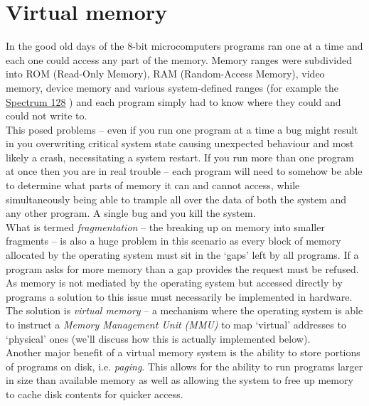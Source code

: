 \section{Virtual memory}

In the good old days of the 8-bit microcomputers programs ran one at a time and
each one could access any part of the memory. Memory ranges were subdivided into
ROM (Read-Only Memory), RAM (Random-Access Memory), video memory, device memory
and various system-defined ranges (for example the
\href{https://worldofspectrum.org/ZXSpectrum128+3Manual/chapter8pt24.html}{Spectrum
  128} \autocite{spectrum128-manual:c8pt24}) and each program simply had to know
where they could and could not write to.\\

This posed problems -- even if you run one program at a time a bug might result in
you overwriting critical system state causing unexpected behaviour and most
likely a crash, necessitating a system restart. If you run more than one program
at once then you are in real trouble -- each program will need to somehow be
able to determine what parts of memory it can and cannot access, while
simultaneously being able to trample all over the data of both the system and
any other program. A single bug and you kill the system.\\

What is termed \emph{fragmentation} -- the breaking up on
memory into smaller fragments -- is also a huge problem in this scenario as
every block of memory allocated by the operating system must sit in the `gaps'
left by all programs. If a program asks for more memory than a gap provides the
request must be refused.\\

As memory is not mediated by the operating system but accessed directly by
programs a solution to this issue must necessarily be implemented in
hardware. The solution is \emph{virtual memory} -- a mechanism where the
operating system is able to instruct a \emph{Memory Management Unit (MMU)} to
map `virtual' addresses to `physical' ones (we'll discuss how this is actually
implemented below).\\

Another major benefit of a virtual memory system is the ability to store
portions of programs on disk, i.e. \emph{paging}. This allows for
the ability to run programs larger in size than available memory as well as
allowing the system to free up memory to cache disk contents for quicker
access.\\

